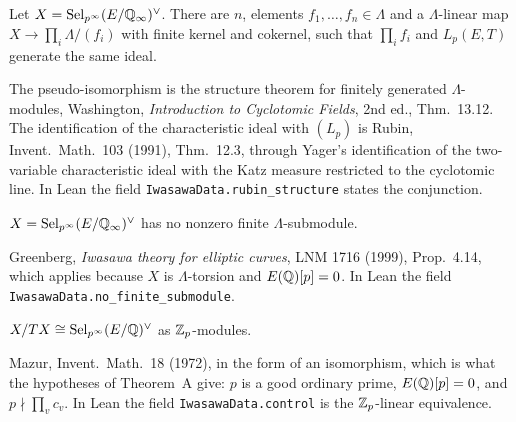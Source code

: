 \begin{assumption}
  \label{assum:RubinStructure}
  \leanok
  Let $X = \mathrm{Sel}_{p^\infty}(E/\mathbb{Q}_\infty)^\vee$. There are $n$,
  elements $f_1, \dots, f_n \in \Lambda$ and a $\Lambda$-linear map
  $X \to \prod_i \Lambda/(f_i)$ with finite kernel and cokernel, such that
  $\prod_i f_i$ and $L_p(E,T)$ generate the same ideal.

  The pseudo-isomorphism is the structure theorem for finitely generated
  $\Lambda$-modules, Washington, \emph{Introduction to Cyclotomic Fields},
  2nd ed., Thm.~13.12. The identification of the characteristic ideal with
  $(L_p)$ is Rubin, Invent.\ Math.\ 103 (1991), Thm.~12.3, through Yager's
  identification of the two-variable characteristic ideal with the Katz
  measure restricted to the cyclotomic line. In Lean the field
  \texttt{IwasawaData.rubin\_structure} states the conjunction.
\end{assumption}

\begin{assumption}
  \label{assum:NoFiniteSubmodule}
  \leanok
  $X = \mathrm{Sel}_{p^\infty}(E/\mathbb{Q}_\infty)^\vee$ has no nonzero finite
  $\Lambda$-submodule.

  Greenberg, \emph{Iwasawa theory for elliptic curves}, LNM 1716 (1999),
  Prop.~4.14, which applies because $X$ is $\Lambda$-torsion and
  $E(\mathbb{Q})[p] = 0$. In Lean the field
  \texttt{IwasawaData.no\_finite\_submodule}.
\end{assumption}

\begin{assumption}
  \label{assum:MazurControl}
  \leanok
  $X/TX \cong \mathrm{Sel}_{p^\infty}(E/\mathbb{Q})^\vee$ as $\mathbb{Z}_p$-modules.

  Mazur, Invent.\ Math.\ 18 (1972), in the form of an isomorphism, which is
  what the hypotheses of Theorem~A give: $p$ is a good ordinary prime,
  $E(\mathbb{Q})[p] = 0$, and $p \nmid \prod_v c_v$. In Lean the field
  \texttt{IwasawaData.control} is the $\mathbb{Z}_p$-linear equivalence.
\end{assumption}

